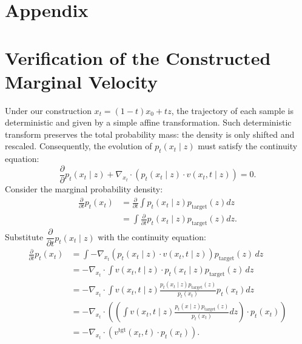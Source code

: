 \clearpage
\section*{Appendix}
\section{Verification of the Constructed Marginal Velocity}\label{app:continuity}

Under our construction $x_t = (1-t) x_0 + t z$, the trajectory of each sample is deterministic and given by a simple affine transformation. Such deterministic transform preserves the total probability mass: the density is only shifted and rescaled. Consequently, the evolution of $p_t(x_t \mid z)$ must satisfy the continuity equation:
%
\begin{equation*}
\frac{\partial}{\partial} p_t(x_t \mid z) + \nabla_{x_t} \cdot (p_t(x_t \mid z) \cdot v(x_t, t \mid z)) = 0.
\end{equation*}
%
Consider the marginal probability density:
%
\begin{align*}
\frac{\partial}{\partial t} p_t(x_t) &= \frac{\partial}{\partial t} \int p_t(x_t \mid z) p_\text{target}(z) dz \\
&= \int  \frac{\partial}{\partial t} p_t(x_t \mid z) p_\text{target} (z) dz.
\end{align*}
%
Substitute $\dfrac{\partial}{\partial t} p_t(x_t \mid z)$ with the continuity equation:
%
\begin{align*}
\frac{\partial}{\partial t} p_t(x_t)
&= \int - \nabla_{x_t} \left( p_t(x_t \mid z) \cdot v(x_t, t \mid z) \right) p_\text{target} (z) \, dz \\
&= - \nabla_{x_t} \cdot \int v(x_t, t \mid z) \cdot p_t(x_t \mid z) p_\text{target} (z) \, dz \\
&= - \nabla_{x_t} \cdot \int v(x_t, t \mid z) \frac{p_t(x_t \mid z) p_\text{target}(z)}{p_t (x_t)} p_t(x_t) dz \\
&= - \nabla_{x_t} \cdot \left( \left( \int v(x_t, t \mid z) \frac{p_t(x \mid z) p_\text{target}(z)}{p_t (x_t)} dz \right) \cdot p_t(x_t) \right) \\
&= - \nabla_{x_t} \cdot \left( v^\text{tgt}(x_t, t) \cdot p_t(x_t) \right).
\end{align*}

